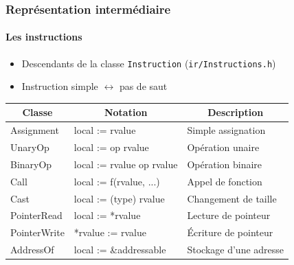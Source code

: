\documentclass{beamer}
\newcommand*{\thead}[1]{\multicolumn{1}{|c|}{\bfseries #1}}
\begin{document}
\begin{frame}
    \frametitle{Représentation intermédiaire}
    \framesubtitle{Les instructions}
    \begin{itemize}
        \item Descendants de la classe \lstinline{Instruction} (\lstinline{ir/Instructions.h})
        \item Instruction simple $\leftrightarrow$ pas de saut
    \end{itemize}
    \pause
    \begin{center}
        \begin{tabular}{ | l | l | l | }
        \hline
        \thead{Classe} & \thead{Notation} & \thead{Description} \\
        \hline 
        Assignment & local := rvalue & Simple assignation \pause \\ 
        \hline 
        UnaryOp & local := op rvalue & Opération unaire \pause \\
        \hline
        BinaryOp & local := rvalue op rvalue & Opération binaire \pause \\
        \hline
        Call & local := f(rvalue, ...) & Appel de fonction \pause \\
        \hline
        Cast & local := (type) rvalue & Changement de taille \pause \\
        \hline
        PointerRead & local := *rvalue & Lecture de pointeur \pause \\
        \hline
        PointerWrite & *rvalue := rvalue & Écriture de pointeur \pause \\
        \hline
        AddressOf & local := \&addressable & Stockage d'une adresse\\
        \hline
        \end{tabular}
    \end{center}
\end{frame}
\end{document}
